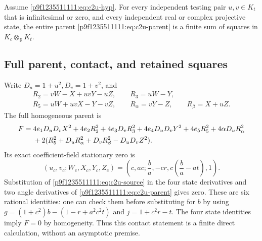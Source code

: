 \begin{theorem}
\label{p9f1235511111:thm:c2u}
Assume \eqref{p9f1235511111:eq:c2u-hyp}.  For every independent testing pair
$u,v\in K_t$ that is infinitesimal or zero, and every independent real
or complex projective state, the entire parent
\eqref{p9f1235511111:eq:c2u-parent} is a finite sum of squares in
$K_c\otimes_{\mathbb R}K_t$.
\end{theorem}

\subsection{Full parent, contact, and retained squares}
Write $D_u=1+u^2,D_v=1+v^2$, and
\[
\begin{gathered}
R_2=vW-X+uvY-uZ,\qquad R_3=uW-Y,\\
R_5=uW+uvX-Y-vZ,\qquad R_\alpha=vY-Z,\qquad R_\beta=X+uZ.
\end{gathered}
\]
The full homogeneous parent is
\begin{align}
F={}&4e_1D_uD_vX^2+4e_2R_2^2+4e_3D_vR_3^2
 +4e_4D_uD_vY^2+4e_5R_5^2+4\alpha D_uR_\alpha^2\notag\\
 &+2(R_5^2+D_uR_\alpha^2+D_vR_\beta^2-D_uD_vZ^2).
\label{p9f1235511111:eq:c2u-parent}
\end{align}
Its exact coefficient-field stationary zero is
\begin{equation}
(u_c,v_c;W_c,X_c,Y_c,Z_c)
=\left(c,ac;\frac ba,-cr,c\left(\frac ba-at\right),1\right).
\label{p9f1235511111:eq:c2u-contact}
\end{equation}
Substitution of \eqref{p9f1235511111:eq:c2u-source} in the four state derivatives and
two angle derivatives of \eqref{p9f1235511111:eq:c2u-parent} gives zero. These are six
rational identities: one can check them before substituting for $b$ by
using $g=(1+c^2)b-(1-r+a^2c^2t)$ and $j=1+c^2r-t$.
The four state identities imply $F=0$ by homogeneity. Thus this contact
statement is a finite direct calculation, without an asymptotic premise.

